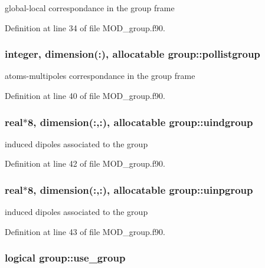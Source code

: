 global-\/local correspondance in the group frame 



Definition at line 34 of file M\-O\-D\-\_\-group.\-f90.

\hypertarget{classgroup_ae76b1bdc2fb015b4edcc24ef18f871cf}{
\subsubsection[{pollistgroup}]{\setlength{\rightskip}{0pt plus 5cm}integer, dimension(\-:), allocatable group\-::pollistgroup}}\label{classgroup_ae76b1bdc2fb015b4edcc24ef18f871cf}


atoms-\/multipoles correspondance in the group frame 



Definition at line 40 of file M\-O\-D\-\_\-group.\-f90.

\hypertarget{classgroup_a2ac2d2816e7a0da15f14f3864b494a2b}{
\subsubsection[{uindgroup}]{\setlength{\rightskip}{0pt plus 5cm}real$\ast$8, dimension(\-:,\-:), allocatable group\-::uindgroup}}\label{classgroup_a2ac2d2816e7a0da15f14f3864b494a2b}


induced dipoles associated to the group 



Definition at line 42 of file M\-O\-D\-\_\-group.\-f90.

\hypertarget{classgroup_aa02596bd4aa59b3de78c044c37663b7d}{
\subsubsection[{uinpgroup}]{\setlength{\rightskip}{0pt plus 5cm}real$\ast$8, dimension(\-:,\-:), allocatable group\-::uinpgroup}}\label{classgroup_aa02596bd4aa59b3de78c044c37663b7d}


induced dipoles associated to the group 



Definition at line 43 of file M\-O\-D\-\_\-group.\-f90.

\hypertarget{classgroup_a372533e525e756e9bcc417cfd240e5c3}{
\subsubsection[{use\-\_\-group}]{\setlength{\rightskip}{0pt plus 5cm}logical group\-::use\-\_\-group}}\label{classgroup_a372533e525e756e9bcc417cfd240e5c3}


